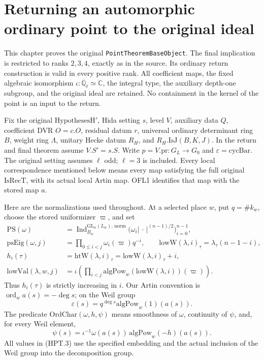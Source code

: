 \section{Returning an automorphic ordinary point to the original ideal}
\label{sec:hida-point-return-v45}

This chapter proves the original \texttt{PointTheoremBaseObject}.
The final implication is restricted to ranks $2,3,4$, exactly as in
the source.  Its ordinary return construction is valid in every
positive rank.  All coefficient maps, the fixed algebraic isomorphism
$\iota:\overline{\mathbb Q}_\ell\simeq\mathbb C$, the integral type,
the auxiliary depth-one subgroup, and the original ideal are retained.
No containment in the kernel of the point is an input to the return.

Fix the original $\mathrm{HypothesesH}'$, Hida setting $s$, level $V$,
auxiliary data $Q$, coefficient DVR $O=c.O$, residual datum $r$,
universal ordinary determinant ring $B$, weight ring $\Lambda$,
unitary Hecke datum $R_H$, and $R_H.\mathrm{IsJ}(B,K,J)$.
In the return and final theorem assume $V.S'=s.S$.
Write $p=V.\mathrm{pr}:G_L\to G_0$ and $\varepsilon=\mathrm{cycBar}$.
The original setting assumes $\ell$ odd; $\ell=3$ is included.
Every local correspondence mentioned below means every map satisfying
the full original $\mathrm{IsRecT}$, with its actual local Artin map.
OFL1 identifies that map with the stored map $a$.

Here are the normalizations used throughout.  At a selected place $w$,
put $q=\#k_w$, choose the stored uniformizer $\varpi$, and set
\[
 \begin{split}
 \mathrm{PS}(\omega)&=\operatorname{Ind}_{B_w}^{\mathrm{GL}_n(L_w),\,\mathrm{norm}}
       \bigl(\omega_i|\,\cdot\,|^{(n-1)/2}\bigr)_{i=0}^{n-1},\\
 \mathrm{psEig}(\omega,j)&=\prod_{0\leq i<j}\omega_i(\varpi)q^{-i},
 \qquad \mathrm{lowW}(\lambda,i)_\tau=\lambda_\tau(n-1-i),\\
 h_i(\tau)&=\mathrm{htW}(\lambda,i)_\tau
                       =\mathrm{lowW}(\lambda,i)_\tau+i,\\
 \mathrm{lowVal}(\lambda,w,j)&=
       \iota\left(\prod_{i<j}\mathrm{algPow}_w
                            (\mathrm{lowW}(\lambda,i))(\varpi)\right).
 \end{split}                                                   \tag{HPT.1}
\]
Thus $h_i(\tau)$ is strictly increasing in $i$.
Our Artin convention is $\operatorname{ord}_w a(s)=-\deg s$;
on the Weil group
\[
 \varepsilon(s)=q^{\deg s}\mathrm{algPow}_w(1)(a(s)).              \tag{HPT.2}
\]
The predicate $\mathrm{OrdChar}(\omega,h,\psi)$ means smoothness of
$\omega$, continuity of $\psi$, and, for every Weil element,
\[
 \psi(s)=\iota^{-1}\omega(a(s))\,
                                \mathrm{algPow}_w(-h)(a(s)).    \tag{HPT.3}
\]
All values in (HPT.3) use the specified embedding and the actual
inclusion of the Weil group into the decomposition group.

